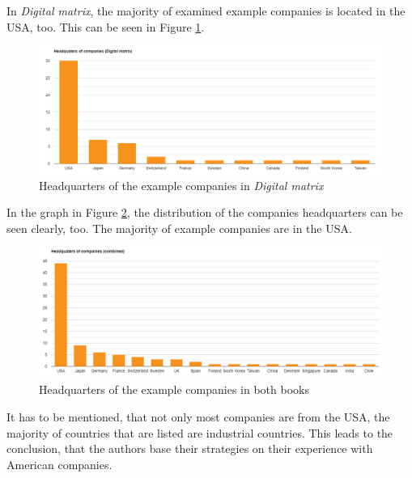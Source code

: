 \documentclass[a4]{scrartcl}
\begin{document}
In \textit{Digital matrix}, the majority of examined example companies is located in the USA, too. This can be seen in Figure \ref{fig:DM_graph}.

\begin{figure}[h!]
	\centering
	\includegraphics[width=1\textwidth]{images/MD_graph.png}
	\caption{Headquarters of the example companies in \textit{Digital matrix} \cite{digitalmatrix}}
	\label{fig:DM_graph}
\end{figure}

In the graph in Figure \ref{fig:C_graph}, the distribution of the companies headquarters can be seen clearly, too. The majority of example companies are in the USA.

\begin{figure}[h!]
	\centering
	\includegraphics[width=1\textwidth]{images/combi_graph.png}
	\caption{Headquarters of the example companies in both books \cite{digitalmatrix, leadingdigital}}
	\label{fig:C_graph}
\end{figure}

It has to be mentioned, that not only most companies are from the USA, the majority of countries that are listed are industrial countries. This leads to the conclusion, that the authors base their strategies on their experience with American companies.








\end{document}
